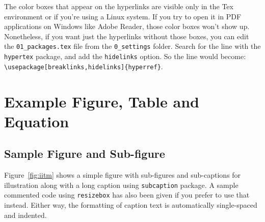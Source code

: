 The color boxes that appear on the hyperlinks are visible only in the Tex environment or if you're using a Linux system. If you try to open it in PDF applications on Windows like Adobe Reader, those color boxes won't show up. Nonetheless, if you want just the hyperlinks without those boxes, you can edit the \verb+01_packages.tex+ file from the \verb+0_settings+ folder. Search for the line with the \verb+hypertex+ package, and add the \verb+hidelinks+ option. So the line would become: \verb+\usepackage[breaklinks,hidelinks]{hyperref}+.

\section{Example Figure, Table and Equation}

\subsection{Sample Figure and Sub-figure}
Figure~\ref{fig:iitm} shows a simple figure with sub-figures and sub-captions for illustration along with a long caption using \verb+subcaption+ package.  A sample commented code using \verb|resizebox| has also been given if you prefer to use that instead. Either way, the formatting of caption text is automatically single-spaced and indented.


